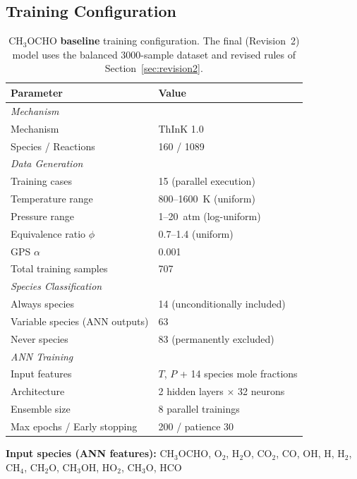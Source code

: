 \documentclass[11pt,a4paper]{article}
\begin{document}
\subsection{Training Configuration}

\begin{table}[H]
\centering
\caption{CH$_3$OCHO \textbf{baseline} training configuration. The final (Revision~2) model uses the balanced 3000-sample dataset and revised rules of Section~\ref{sec:revision2}.}
\label{tab:ch3ocho_config}
\begin{tabular}{ll}
\toprule
\textbf{Parameter} & \textbf{Value} \\
\midrule
\multicolumn{2}{l}{\textit{Mechanism}} \\
\quad Mechanism & ThInK 1.0 \\
\quad Species / Reactions & 160 / 1089 \\
\midrule
\multicolumn{2}{l}{\textit{Data Generation}} \\
\quad Training cases & 15 (parallel execution) \\
\quad Temperature range & 800--1600~K (uniform) \\
\quad Pressure range & 1--20~atm (log-uniform) \\
\quad Equivalence ratio $\phi$ & 0.7--1.4 (uniform) \\
\quad GPS $\alpha$ & 0.001 \\
\quad Total training samples & 707 \\
\midrule
\multicolumn{2}{l}{\textit{Species Classification}} \\
\quad Always species & 14 (unconditionally included) \\
\quad Variable species (ANN outputs) & 63 \\
\quad Never species & 83 (permanently excluded) \\
\midrule
\multicolumn{2}{l}{\textit{ANN Training}} \\
\quad Input features & $T$, $P$ + 14 species mole fractions \\
\quad Architecture & 2 hidden layers $\times$ 32 neurons \\
\quad Ensemble size & 8 parallel trainings \\
\quad Max epochs / Early stopping & 200 / patience 30 \\
\bottomrule
\end{tabular}
\end{table}

\textbf{Input species (ANN features):} CH$_3$OCHO, O$_2$, H$_2$O, CO$_2$, CO, OH, H, H$_2$, CH$_4$, CH$_2$O, CH$_3$OH, HO$_2$, CH$_3$O, HCO
\end{document}
